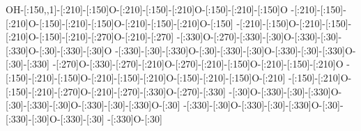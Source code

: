 OH-[:150,,1]-[:210]-[:150]O-[:210]-[:150]-[:210]O-[:150]-[:210]-[:150]O%
-[:210]-[:150]-[:210]O-[:150]-[:210]-[:150]O-[:210]-[:150]-[:210]O-[:150]%
-[:210]-[:150]O-[:210]-[:150]-[:210]O-[:150]-[:210]-[:270]O-[:210]-[:270]%
-[:330]O-[:270]-[:330]-[:30]O-[:330]-[:30]-[:330]O-[:30]-[:330]-[:30]O%
-[:330]-[:30]-[:330]O-[:30]-[:330]-[:30]O-[:330]-[:30]-[:330]O-[:30]-[:330]%
-[:270]O-[:330]-[:270]-[:210]O-[:270]-[:210]-[:150]O-[:210]-[:150]-[:210]O%
-[:150]-[:210]-[:150]O-[:210]-[:150]-[:210]O-[:150]-[:210]-[:150]O-[:210]%
-[:150]-[:210]O-[:150]-[:210]-[:270]O-[:210]-[:270]-[:330]O-[:270]-[:330]%
-[:30]O-[:330]-[:30]-[:330]O-[:30]-[:330]-[:30]O-[:330]-[:30]-[:330]O-[:30]%
-[:330]-[:30]O-[:330]-[:30]-[:330]O-[:30]-[:330]-[:30]O-[:330]-[:30]%
-[:330]O-[:30]